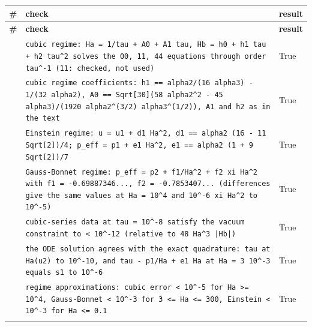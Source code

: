 \documentclass[10pt,a4paper]{article}
\begin{document}
{\footnotesize
\begin{longtable}{>{\raggedright\arraybackslash}p{}>{\raggedright\arraybackslash}p{}>{\raggedright\arraybackslash}p{}}
\toprule
\textbf{\#} & \textbf{check} & \textbf{result} \\
\midrule\endfirsthead
\toprule
\textbf{\#} & \textbf{check} & \textbf{result} \\
\midrule\endhead
\endfoot
\bottomrule\endlastfoot
370 & \texttt{cubic regime: Ha = 1/\allowbreak{}tau + A0 + A1 tau, Hb = h0 + h1 tau + h2 tau\textasciicircum{}2 solves the 00, 11, 44 equations through order tau\textasciicircum{}-1 (11: checked, not used)} & True \\
371 & \texttt{cubic regime coefficients: h1 == alpha2/\allowbreak{}(16 alpha3) - 1/\allowbreak{}(32 alpha2), A0 == Sqrt[30](58 alpha2\textasciicircum{}2 - 45 alpha3)/\allowbreak{}(1920 alpha2\textasciicircum{}(3/\allowbreak{}2) alpha3\textasciicircum{}(1/\allowbreak{}2)), A1 and h2 as in the text} & True \\
372 & \texttt{Einstein regime: u = u1 + d1 Ha\textasciicircum{}2, d1 == alpha2 (16 - 11 Sqrt[2])/\allowbreak{}4; p\_\allowbreak{}eff = p1 + e1 Ha\textasciicircum{}2, e1 == alpha2 (1 + 9 Sqrt[2])/\allowbreak{}7} & True \\
373 & \texttt{Gauss-Bonnet regime: p\_\allowbreak{}eff = p2 + f1/\allowbreak{}Ha\textasciicircum{}2 + f2 xi Ha\textasciicircum{}2 with f1 = -0.69887346..., f2 = -0.7853407... (differences give the same values at Ha = 10\textasciicircum{}4 and 10\textasciicircum{}-6 xi Ha\textasciicircum{}2 to 10\textasciicircum{}-5)} & True \\
374 & \texttt{cubic-series data at tau = 10\textasciicircum{}-8 satisfy the vacuum constraint to < 10\textasciicircum{}-12 (relative to 48 Ha\textasciicircum{}3 |Hb|)} & True \\
375 & \texttt{the ODE solution agrees with the exact quadrature: tau at Ha(u2) to 10\textasciicircum{}-10, and tau - p1/\allowbreak{}Ha + e1 Ha at Ha = 3 10\textasciicircum{}-3 equals s1 to 10\textasciicircum{}-6} & True \\
376 & \texttt{regime approximations: cubic error < 10\textasciicircum{}-5 for Ha >= 10\textasciicircum{}4, Gauss-Bonnet < 10\textasciicircum{}-3 for 3 <= Ha <= 300, Einstein < 10\textasciicircum{}-3 for Ha <= 0.1} & True \\*
\end{longtable}}
\end{document}
